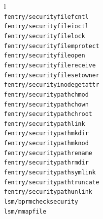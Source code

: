 \begin{table}[t]
  \centering
  \label{table-fs-hooks}
  \begin{tabular}{ l }
    \toprule
    \\
    \midrule
    {\tt fentry/security\textunderscore file\textunderscore fcntl}                        \\
    {\tt fentry/security\textunderscore file\textunderscore ioctl}                        \\
    {\tt fentry/security\textunderscore file\textunderscore lock}                         \\
    {\tt fentry/security\textunderscore file\textunderscore mprotect}                     \\
    {\tt fentry/security\textunderscore file\textunderscore open}                         \\
    {\tt fentry/security\textunderscore file\textunderscore receive}                      \\
    {\tt fentry/security\textunderscore file\textunderscore set\textunderscore owner}     \\
    {\tt fentry/security\textunderscore inode\textunderscore getattr}                     \\         
    {\tt fentry/security\textunderscore path\textunderscore chmod}                        \\
    {\tt fentry/security\textunderscore path\textunderscore chown}                        \\
    {\tt fentry/security\textunderscore path\textunderscore chroot}                       \\
    {\tt fentry/security\textunderscore path\textunderscore link}                         \\            
    {\tt fentry/security\textunderscore path\textunderscore mkdir}                        \\    
    {\tt fentry/security\textunderscore path\textunderscore mknod}                        \\
    {\tt fentry/security\textunderscore path\textunderscore rename}                       \\
    {\tt fentry/security\textunderscore path\textunderscore rmdir}                        \\    
    {\tt fentry/security\textunderscore path\textunderscore symlink}                      \\
    {\tt fentry/security\textunderscore path\textunderscore truncate}                     \\
    {\tt fentry/security\textunderscore path\textunderscore unlink}                       \\
    {\tt lsm/bprm\textunderscore check\textunderscore security}                           \\
    {\tt lsm/mmap\textunderscore file}                                                    \\
    \bottomrule
  \end{tabular}
  \caption{List of fil system traced hook points.}
\end{table}


